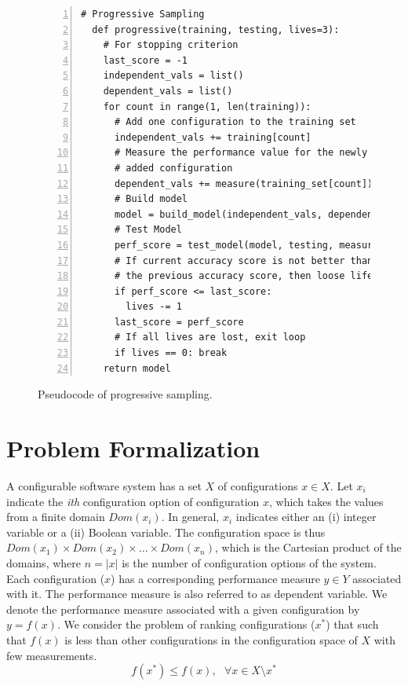 \begin{figure}[t]
\small
\hspace{0.2cm}\begin{lstlisting}[xleftmargin=5.0ex,mathescape,frame=none,numbers=left]
  # Progressive Sampling
  def progressive(training, testing, lives=3): 
    # For stopping criterion
    last_score = -1
    independent_vals = list()
    dependent_vals = list()
    for count in range(1, len(training)):    
      # Add one configuration to the training set
      independent_vals += training[count]      
      # Measure the performance value for the newly
      # added configuration 
      dependent_vals += measure(training_set[count])  
      # Build model
      model = build_model(independent_vals, dependent_vals)      
      # Test Model
      perf_score = test_model(model, testing, measure(testing))
      # If current accuracy score is not better than
      # the previous accuracy score, then loose life
      if perf_score <= last_score:
        lives -= 1
      last_score = perf_score
      # If all lives are lost, exit loop
      if lives == 0: break 
    return model
\end{lstlisting}
\caption{\small{Pseudocode of progressive sampling.}}
\label{fig:progressive_sampling}  
\end{figure}

\section{Problem Formalization}\label{sec:problem_formal}

A configurable software system has a set $X$ of configurations $x \in X$. Let $x_i$ indicate the \textit{ith} configuration option of configuration $x$, which takes the values from a finite domain $Dom(x_i)$. In general, $x_i$ indicates either an (i) integer variable or a (ii) Boolean variable. The configuration space is thus $Dom(x_1) \times Dom(x_2) \times ... \times Dom(x_n)$, which is the Cartesian product of the domains, where $n = |x|$ is the number of configuration options of the system. Each configuration ($x$) has a corresponding performance measure $y \in Y$ associated with it. The performance measure is also referred to as dependent variable. We denote the performance measure associated with a given configuration by $y=f(x)$.  We consider the problem of ranking  configurations ($x^*$) that such that $f(x)$ is less than other configurations in the configuration space of $X$ with few measurements.
\begin{equation}
    f(x^*) \le f(x),~~~ \forall x \in {X\setminus x^*}
\end{equation}
 
